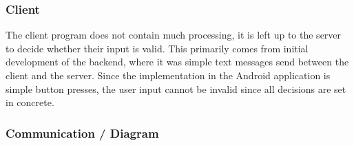 \documentclass[11pt]{article}
\begin{document}
\subsubsection{Client}

The client program does not contain much processing, it is left up to the server to decide whether their input is valid. This primarily comes from initial development of the backend, where it was simple text messages send between the client and the server. Since the implementation in the Android application is simple button presses, the user input cannot be invalid since all decisions are set in concrete. \\


\subsubsection{Communication / Diagram}






%
%
%
%

\end{document}
